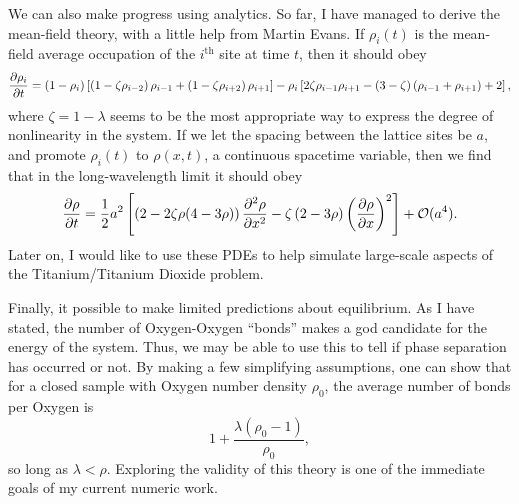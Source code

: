 We can also make progress using analytics. So far, I have managed to derive the mean-field theory, with a little help from Martin Evans. If $\rho_i (t)$ is the mean-field average occupation of the $i^\mathrm{th}$ site at time $t$, then
it should obey
\begin{equation}
 \frac{\partial \rho_i}{\partial t} = \left( 1-\rho_i \right) \left[ \left(1-\zeta\rho_{i-2} \right) \rho_{i-1} + \left(1-\zeta\rho_{i+2} \right) \rho_{i+1} \right]
 - \rho_i \left[ 2 \zeta \rho_{i-1} \rho_{i+1}  - (3-\zeta)\left(\rho_{i-1} + \rho_{i+1}\right) + 2 \right],
\end{equation}
where $\zeta = 1-\lambda$ seems to be the most appropriate way to express the degree of nonlinearity in the system. If we let the spacing between the lattice sites be $a$, and promote $\rho_i (t)$ to $\rho(x, t)$, a continuous
spacetime variable, then we find that in the long-wavelength limit it should obey
\begin{equation}
 \frac{\partial \rho}{\partial t} = \frac{1}{2} a^2 \left[ \left( 2 - 2 \zeta \rho (4-3\rho) \right) \frac{\partial ^2 \rho}{\partial x^2} - \zeta \left(2-3\rho\right) \left(\frac{\partial \rho}{\partial x}\right)^2 \right] + \mathcal{O}(a^4).
 \label{eq: longRangePDE}
\end{equation}
Later on, I would like to use these PDEs to help simulate large-scale aspects of the Titanium/Titanium Dioxide problem.

Finally, it possible to make limited predictions about equilibrium. As I have stated, the number of Oxygen-Oxygen ``bonds'' makes a god candidate for the energy of the system. Thus, we may be able to use this to tell if phase separation has
occurred or not. By making a few simplifying assumptions, one can show that for a closed sample with Oxygen number density $\rho_0$, the average number of bonds per Oxygen is 
\begin{equation}
 1 + \frac{\lambda \left( \rho_0 -1 \right)}{\rho_0},
 \label{eq: eqmBehaviour}
\end{equation}
so long as $\lambda < \rho$. Exploring the validity of this theory is one of the immediate goals of my current numeric work.



